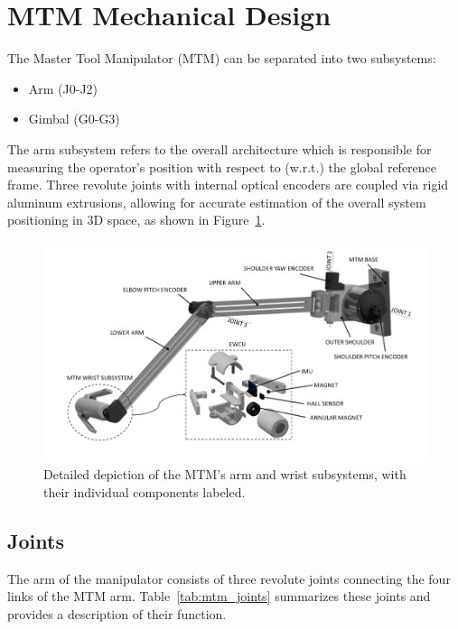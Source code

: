\section{MTM Mechanical Design}

The Master Tool Manipulator (MTM) can be separated into two subsystems:
\begin{itemize}
    \item Arm (J0-J2)
    \item Gimbal (G0-G3)
\end{itemize}

The arm subsystem refers to the overall architecture which is responsible for measuring the operator's position with respect to (w.r.t.) the global reference frame. Three revolute joints with internal optical encoders are coupled via rigid aluminum extrusions, allowing for accurate estimation of the overall system positioning in 3D space, as shown in Figure~\ref{fig:mtm_overview}.

\begin{figure}[h]
    \centering
    \includegraphics[width=0.75\linewidth]{mtm_overview.png}
    \caption{Detailed depiction of the MTM's arm and wrist subsystems, with their individual components labeled.}
    \label{fig:mtm_overview}
\end{figure}

\subsection{Joints}
The arm of the manipulator consists of three revolute joints connecting the four links of the MTM arm. Table~\ref{tab:mtm_joints} summarizes these joints and provides a description of their function.

